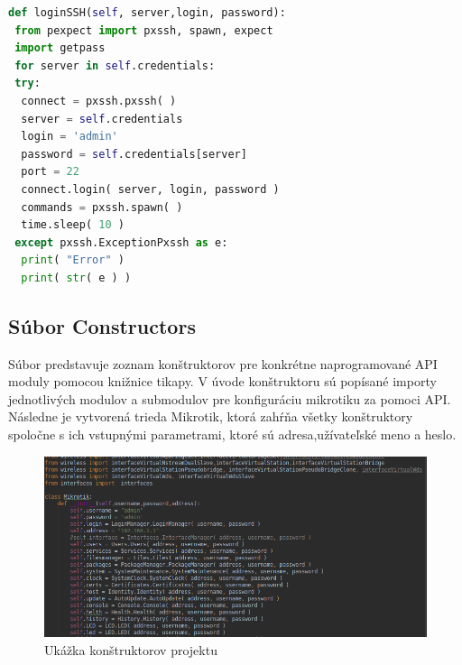 \begin{lstlisting}[language=python, frame=single, caption=Metóda hromadného prihlásenia pomocou protokolu SSH,captionpos=b, showstringspaces=false]
 def loginSSH(self, server,login, password):
 from pexpect import pxssh, spawn, expect
 import getpass
 for server in self.credentials:
 try:
  connect = pxssh.pxssh( )
  server = self.credentials
  login = 'admin'
  password = self.credentials[server]
  port = 22
  connect.login( server, login, password )
  commands = pxssh.spawn( )
  time.sleep( 10 )
 except pxssh.ExceptionPxssh as e:
  print( "Error" )
  print( str( e ) )
\end{lstlisting}
\subsection{Súbor Constructors}
Súbor predstavuje zoznam konštruktorov pre konkrétne naprogramované API moduly pomocou knižnice tikapy. V úvode konštruktoru sú popísané importy jednotlivých modulov a submodulov pre konfiguráciu mikrotiku za pomoci API. \\
Následne je vytvorená trieda Mikrotik, ktorá zahŕňa všetky konštruktory spoločne s ich vstupnými parametrami, ktoré sú adresa,užívateľské meno a heslo. 
\begin{figure}[H]
\centering
\includegraphics[scale=0.5]{../text/constructors.png}
\caption{Ukážka konštruktorov projektu}
\label{fig:constructors}
\end{figure} 
